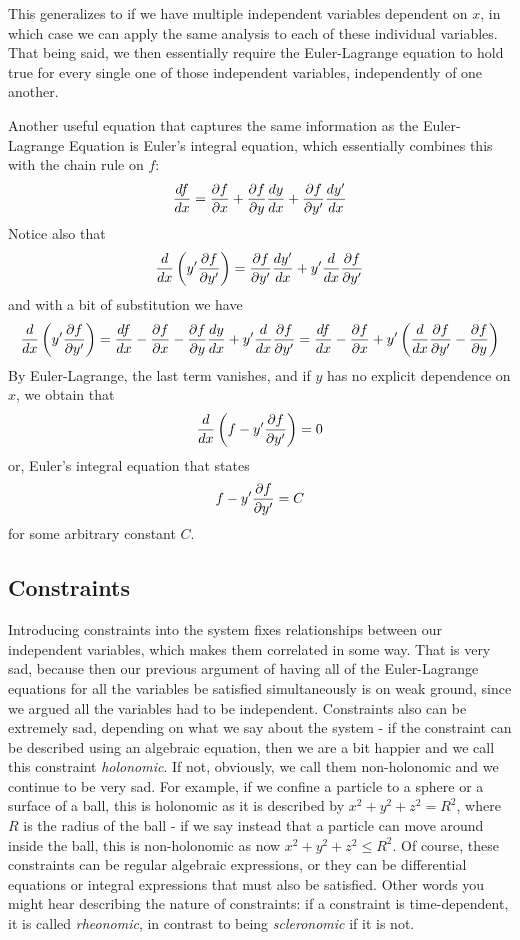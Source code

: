 This generalizes to if we have multiple independent variables dependent on $x$, in which case we can apply the same analysis to each of these individual variables. That being said, we then essentially require the Euler-Lagrange equation to hold true for every single one of those independent variables, independently of one another. 

Another useful equation that captures the same information as the Euler-Lagrange Equation is Euler's integral equation, which essentially combines this with the chain rule on $f$:
\[
	\frac{d f}{d x} = \frac{\partial f}{\partial x} + \frac{\partial f}{\partial y}\frac{d y}{d x} + \frac{\partial f}{\partial y'}\frac{d y'}{d x}
\]
Notice also that 
\[
	\frac{d }{d x}\left(y' \frac{\partial f}{\partial y'} \right) = \frac{\partial f}{\partial y'} \frac{d y'}{d x} + y' \frac{d }{d x} \frac{\partial f}{\partial y'} 
\]
and with a bit of substitution we have 
\[
	\frac{d }{d x}\left(y' \frac{\partial f}{\partial y'} \right) = \frac{d f}{d x} - \frac{\partial f}{\partial x} - \frac{\partial f}{\partial y}\frac{d y}{d x} + y' \frac{d }{d x} \frac{\partial f}{\partial y'} = \frac{d f}{d x} - \frac{\partial f}{\partial x} + y'\left(\frac{d }{d x} \frac{\partial f}{\partial y'} - \frac{\partial f}{\partial y}\right)
\]
By Euler-Lagrange, the last term vanishes, and if $y$ has no explicit dependence on $x$, we obtain that 
\[
	\frac{d }{d x} \left( f - y' \frac{\partial f}{\partial y'} \right) = 0
\]
or, Euler's integral equation that states 
\[
	 f - y' \frac{\partial f}{\partial y'} = C
\]
for some arbitrary constant $C$.

\subsection{Constraints}
Introducing constraints into the system fixes relationships between our independent variables, which makes them correlated in some way. That is very sad, because then our previous argument of having all of the Euler-Lagrange equations for all the variables be satisfied simultaneously is on weak ground, since we argued all the variables had to be independent. Constraints also can be extremely sad, depending on what we say about the system - if the constraint can be described using an algebraic equation, then we are a bit happier and we call this constraint \textit{holonomic}. If not, obviously, we call them non-holonomic and we continue to be very sad. For example, if we confine a particle to a sphere or a surface of a ball, this is holonomic as it is described by $x^2 + y^2 + z^2 = R^2$, where $R$ is the radius of the ball - if we say instead that a particle can move around inside the ball, this is non-holonomic as now $x^2 + y^2 + z^2 \leq R^2$. Of course, these constraints  can be regular algebraic expressions, or they can be differential equations or integral expressions that must also be satisfied. Other words you might hear describing the nature of constraints: if a constraint is time-dependent, it is called \textit{rheonomic}, in contrast to being \textit{scleronomic} if it is not. 


